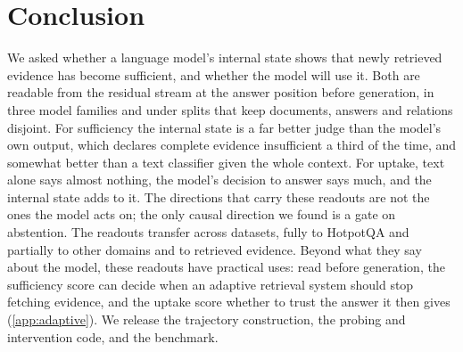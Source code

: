 \section{Conclusion}
We asked whether a language model's internal state shows that newly retrieved evidence has become sufficient, and whether the model will use it. Both are readable from the residual stream at the answer position before generation, in three model families and under splits that keep documents, answers and relations disjoint. For sufficiency the internal state is a far better judge than the model's own output, which declares complete evidence insufficient a third of the time, and somewhat better than a text classifier given the whole context. For uptake, text alone says almost nothing, the model's decision to answer says much, and the internal state adds to it. The directions that carry these readouts are not the ones the model acts on; the only causal direction we found is a gate on abstention. The readouts transfer across datasets, fully to HotpotQA and partially to other domains and to retrieved evidence. Beyond what they say about the model, these readouts have practical uses: read before generation, the sufficiency score can decide when an adaptive retrieval system should stop fetching evidence, and the uptake score whether to trust the answer it then gives (\cref{app:adaptive}). We release the trajectory construction, the probing and intervention code, and the benchmark.
